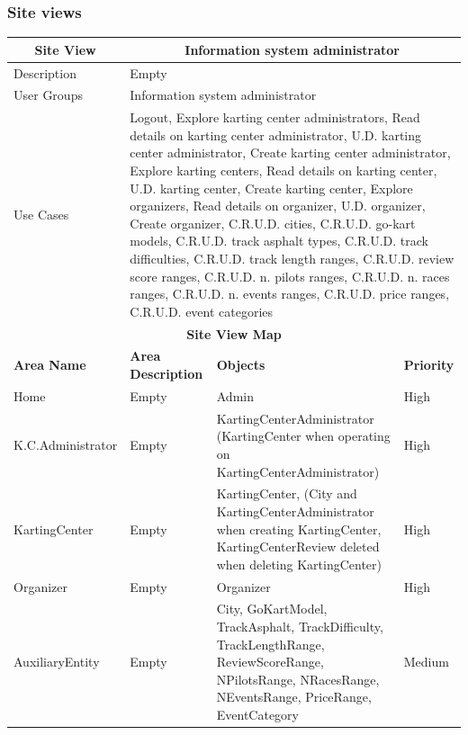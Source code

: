 \documentclass{beamer}
\begin{document}
\begin{frame}
    \frametitle{Site views}
    \begin{table}
        \centering
        \tiny
        \setlength{\tabcolsep}{1pt}
        \begin{tabular}{|m{2cm}|m{4cm}|m{3cm}|m{1cm}|}
        \hline
        \multicolumn{1}{|c|}{\textbf{Site View}} & \multicolumn{3}{c|}{\textbf{Information system administrator}} \\
        \hline
        Description & \multicolumn{3}{m{8cm}|}{Empty} \\
        \hline
        User Groups & \multicolumn{3}{m{8cm}|}{Information system administrator} \\
        \hline
        Use Cases & \multicolumn{3}{m{8cm}|}{Logout, Explore karting center administrators, 
        Read details on karting center administrator, U.D. karting center administrator, 
        Create karting center administrator, Explore karting centers, 
        Read details on karting center, U.D. karting center, Create karting center, 
        Explore organizers, Read details on organizer, U.D. organizer, Create organizer, 
        C.R.U.D. cities, C.R.U.D. go-kart models, C.R.U.D. track asphalt types, 
        C.R.U.D. track difficulties, C.R.U.D. track length ranges, C.R.U.D. review score ranges, 
        C.R.U.D. n. pilots ranges, C.R.U.D. n. races ranges, C.R.U.D. n. events ranges, 
        C.R.U.D. price ranges, C.R.U.D. event categories } \\
        \hline
        \multicolumn{4}{|c|}{\textbf{Site View Map}} \\
        \hline
        \textbf{Area Name} & \textbf{Area Description} & \textbf{Objects} & \textbf{Priority} \\
        \hline
        Home & Empty & Admin & High \\
        \hline
        K.C.Administrator & Empty & KartingCenterAdministrator (KartingCenter when operating
        on KartingCenterAdministrator) & High \\
        \hline
        KartingCenter & Empty & KartingCenter, (City and KartingCenterAdministrator when creating KartingCenter, KartingCenterReview 
        deleted when deleting KartingCenter) & High \\
        \hline
        Organizer & Empty & Organizer & High \\
        \hline
        AuxiliaryEntity & Empty & City, GoKartModel, 
        TrackAsphalt, TrackDifficulty, TrackLengthRange, ReviewScoreRange, NPilotsRange, NRacesRange, NEventsRange, PriceRange, EventCategory & Medium \\
        \hline
        \end{tabular}
    \end{table}
\end{frame}
\end{document}
